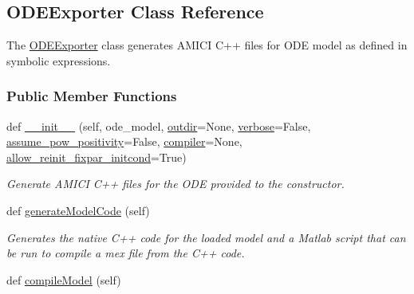 \hypertarget{classamici_1_1ode__export_1_1_o_d_e_exporter}{}\subsection{O\+D\+E\+Exporter Class Reference}
\label{classamici_1_1ode__export_1_1_o_d_e_exporter}


The \mbox{\hyperlink{classamici_1_1ode__export_1_1_o_d_e_exporter}{O\+D\+E\+Exporter}} class generates A\+M\+I\+CI C++ files for O\+DE model as defined in symbolic expressions.  


\subsubsection*{Public Member Functions}
\begin{DoxyCompactItemize}
\item 
def \mbox{\hyperlink{classamici_1_1ode__export_1_1_o_d_e_exporter_ade5a56f9eda68f70b441b904113d766b}{\+\_\+\+\_\+init\+\_\+\+\_\+}} (self, ode\+\_\+model, \mbox{\hyperlink{classamici_1_1ode__export_1_1_o_d_e_exporter_aac4f80ee02f9c658ec0633be070b1c1b}{outdir}}=None, \mbox{\hyperlink{classamici_1_1ode__export_1_1_o_d_e_exporter_aa9e289eddb591991c9bc7321dc5b186b}{verbose}}=False, \mbox{\hyperlink{classamici_1_1ode__export_1_1_o_d_e_exporter_a29c4626a170365ee3773218f11565690}{assume\+\_\+pow\+\_\+positivity}}=False, \mbox{\hyperlink{classamici_1_1ode__export_1_1_o_d_e_exporter_a3da8f16c6fe93b3b56fc83d5ceda9ead}{compiler}}=None, \mbox{\hyperlink{classamici_1_1ode__export_1_1_o_d_e_exporter_a50ba58e6df269149d17dda632a15620a}{allow\+\_\+reinit\+\_\+fixpar\+\_\+initcond}}=True)
\begin{DoxyCompactList}\small\item\em Generate A\+M\+I\+CI C++ files for the O\+DE provided to the constructor. \end{DoxyCompactList}\item 
def \mbox{\hyperlink{classamici_1_1ode__export_1_1_o_d_e_exporter_a3ec6677c764c1a2d57a51d8a9f468310}{generate\+Model\+Code}} (self)
\begin{DoxyCompactList}\small\item\em Generates the native C++ code for the loaded model and a Matlab script that can be run to compile a mex file from the C++ code. \end{DoxyCompactList}\item 
def \mbox{\hyperlink{classamici_1_1ode__export_1_1_o_d_e_exporter_a61bf03049b9989d73b584fbca9f8d499}{compile\+Model}} (self)

\end{DoxyCompactItemize}
